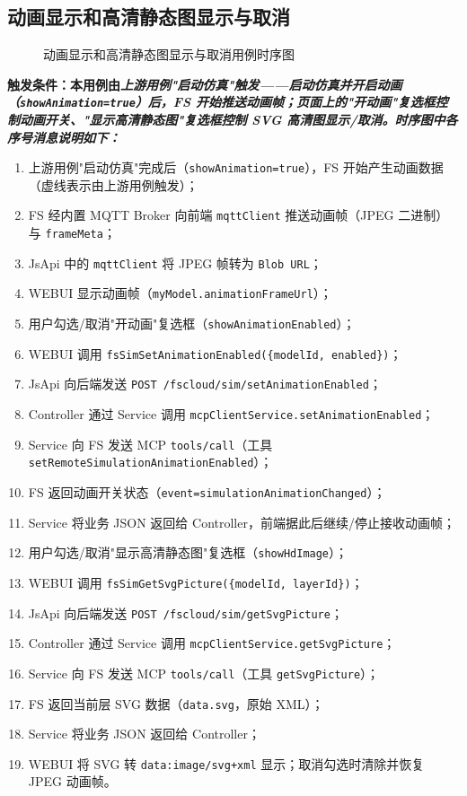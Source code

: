 \subsection{动画显示和高清静态图显示与取消}
\begin{figure}[!h]
	\centering
	\resizebox{1.0\linewidth}{!}{}
	\caption{动画显示和高清静态图显示与取消用例时序图}\label{fig:animationDisplay}
\end{figure}
\bf{触发条件}：本用例由\it{上游用例"启动仿真"}触发——启动仿真并开启动画（\texttt{showAnimation=true}）后，FS 开始推送动画帧；页面上的"开动画"复选框控制动画开关、"显示高清静态图"复选框控制 SVG 高清图显示/取消。时序图中各序号消息说明如下：
\begin{enumerate}[label=\arabic*)]
	\item 上游用例"启动仿真"完成后（\texttt{showAnimation=true}），FS 开始产生动画数据（虚线表示由上游用例触发）；
	\item FS 经内置 MQTT Broker 向前端 \texttt{mqttClient} 推送动画帧（JPEG 二进制）与 \texttt{frameMeta}；
	\item JsApi 中的 \texttt{mqttClient} 将 JPEG 帧转为 \texttt{Blob URL}；
	\item WEBUI 显示动画帧（\texttt{myModel.animationFrameUrl}）；
	\item 用户勾选/取消"开动画"复选框（\texttt{showAnimationEnabled}）；
	\item WEBUI 调用 \texttt{fsSimSetAnimationEnabled(\{modelId, enabled\})}；
	\item JsApi 向后端发送 \texttt{POST /fscloud/sim/setAnimationEnabled}；
	\item Controller 通过 Service 调用 \texttt{mcpClientService.setAnimationEnabled}；
	\item Service 向 FS 发送 MCP \texttt{tools/call}（工具 \texttt{setRemoteSimulationAnimationEnabled}）；
	\item FS 返回动画开关状态（\texttt{event=simulationAnimationChanged}）；
	\item Service 将业务 JSON 返回给 Controller，前端据此后继续/停止接收动画帧；
	\item 用户勾选/取消"显示高清静态图"复选框（\texttt{showHdImage}）；
	\item WEBUI 调用 \texttt{fsSimGetSvgPicture(\{modelId, layerId\})}；
	\item JsApi 向后端发送 \texttt{POST /fscloud/sim/getSvgPicture}；
	\item Controller 通过 Service 调用 \texttt{mcpClientService.getSvgPicture}；
	\item Service 向 FS 发送 MCP \texttt{tools/call}（工具 \texttt{getSvgPicture}）；
	\item FS 返回当前层 SVG 数据（\texttt{data.svg}，原始 XML）；
	\item Service 将业务 JSON 返回给 Controller；
	\item WEBUI 将 SVG 转 \texttt{data:image/svg+xml} 显示；取消勾选时清除并恢复 JPEG 动画帧。
\end{enumerate}

